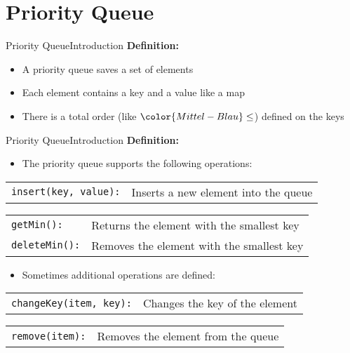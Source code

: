 \section{Priority Queue}


\begin{frame}{Priority Queue}{Introduction}
  \textbf{Definition:}
  \begin{itemize}
    \item<2->
      A priority queue saves a set of elements
    \item<3->
      Each element contains a key and a value like a map
    \item<4->
      There is a total order (like ${\color{Mittel-Blau}\leq}$) defined on the
      keys
  \end{itemize}
\end{frame}


\begin{frame}{Priority Queue}{Introduction}
  \textbf{Definition:}
  \begin{itemize}
    \item<2->
      The priority queue supports the following operations:
  \end{itemize}
  \begin{tabular}{ll}
    {\color{Mittel-Blau}\texttt{insert(key, value):}} &
    Inserts a new element into the queue
  \end{tabular}
  \begin{tabular}{ll}
    {\color{Mittel-Blau}\texttt{getMin():}} &
    Returns the element with the smallest key\\
    {\color{Mittel-Blau}\texttt{deleteMin():}} &
    Removes the element with the smallest key
  \end{tabular}
  \vspace{1.0em}
  \begin{itemize}
    \item<5->
      Sometimes additional operations are defined:
  \end{itemize}
  \begin{tabular}{ll}
    {\color{Mittel-Blau}\texttt{changeKey(item, key):}} &
    Changes the key of the element
  \end{tabular}
  \begin{tabular}{ll}
    {\color{Mittel-Blau}\texttt{remove(item):}} &
    Removes the element from the queue
  \end{tabular}
\end{frame}

